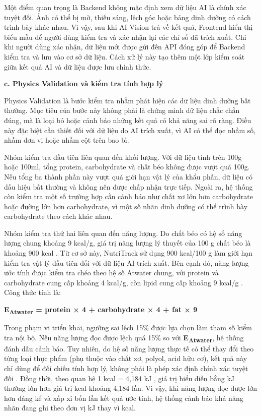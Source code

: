 \documentclass[12pt, a4paper]{report}
\begin{document}
Một điểm quan trọng là Backend không mặc định xem dữ liệu AI là chính xác tuyệt đối. Ảnh có thể bị mờ, thiếu sáng, lệch góc hoặc bảng dinh dưỡng có cách trình bày khác nhau. Vì vậy, sau khi AI Vision trả về kết quả, Frontend hiển thị biểu mẫu để người dùng kiểm tra và xác nhận lại các chỉ số đã trích xuất. Chỉ khi người dùng xác nhận, dữ liệu mới được gửi đến API đóng góp để Backend kiểm tra và lưu vào cơ sở dữ liệu. Cách xử lý này tạo thêm một lớp kiểm soát giữa kết quả AI và dữ liệu được lưu chính thức.

\textbf{c. Physics Validation và kiểm tra tính hợp lý}

Physics Validation là bước kiểm tra nhằm phát hiện các dữ liệu dinh dưỡng bất thường. Mục tiêu của bước này không phải là chứng minh dữ liệu chắc chắn đúng, mà là loại bỏ hoặc cảnh báo những kết quả có khả năng sai rõ ràng. Điều này đặc biệt cần thiết đối với dữ liệu do AI trích xuất, vì AI có thể đọc nhầm số, nhầm đơn vị hoặc nhầm cột trên bao bì.

Nhóm kiểm tra đầu tiên liên quan đến khối lượng. Với dữ liệu tính trên 100g hoặc 100ml, tổng protein, carbohydrate và chất béo không được vượt quá 100g. Nếu tổng ba thành phần này vượt quá giới hạn vật lý của khẩu phần, dữ liệu có dấu hiệu bất thường và không nên được chấp nhận trực tiếp. Ngoài ra, hệ thống còn kiểm tra một số trường hợp cần cảnh báo như chất xơ lớn hơn carbohydrate hoặc đường lớn hơn carbohydrate, vì một số nhãn dinh dưỡng có thể trình bày carbohydrate theo cách khác nhau.

Nhóm kiểm tra thứ hai liên quan đến năng lượng. Do chất béo có hệ số năng lượng chung khoảng 9 kcal/g, giá trị năng lượng lý thuyết của 100 g chất béo là khoảng 900 kcal \cite{vien_dinh_duong_2007, fao_2003}. Từ cơ sở này, NutriTrack sử dụng 900 kcal/100 g làm giới hạn kiểm tra vật lý đầu tiên đối với dữ liệu AI trích xuất. Bên cạnh đó, năng lượng ước tính được kiểm tra chéo theo hệ số Atwater chung, với protein và carbohydrate cung cấp khoảng 4 kcal/g, còn lipid cung cấp khoảng 9 kcal/g \cite{vien_dinh_duong_2007, fao_2003}. Công thức tính là:

\textbf{E\textsubscript{Atwater} = protein × 4 + carbohydrate × 4 + fat × 9}

Trong phạm vi triển khai, ngưỡng sai lệch 15\% được lựa chọn làm tham số kiểm tra nội bộ. Nếu năng lượng đọc được lệch quá 15\% so với \textbf{E\textsubscript{Atwater}}, hệ thống đánh dấu cảnh báo. Tuy nhiên, do hệ số năng lượng thực tế có thể thay đổi theo từng loại thực phẩm (phụ thuộc vào chất xơ, polyol, acid hữu cơ), kết quả này chỉ dùng để đối chiếu tính hợp lý, không phải là phép xác định chính xác tuyệt đối \cite{fao_2003}. Đồng thời, theo quan hệ 1 kcal = 4,184 kJ \cite{vien_dinh_duong_2007, fao_2003}, giá trị biểu diễn bằng kJ thường lớn hơn giá trị kcal khoảng 4,184 lần. Vì vậy, khi năng lượng đọc được lớn hơn đáng kể và xấp xỉ bốn lần kết quả ước tính, hệ thống cảnh báo khả năng nhãn đang ghi theo đơn vị kJ thay vì kcal.
\end{document}
